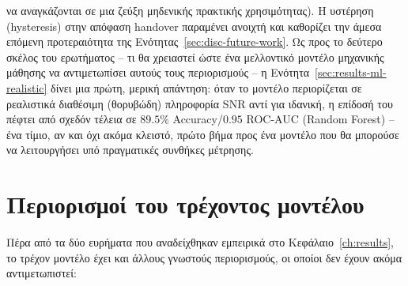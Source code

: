 \begin{itemize}
    να αναγκάζονται σε μια ζεύξη μηδενικής πρακτικής χρησιμότητας). Η
    υστέρηση (hysteresis) στην απόφαση handover παραμένει ανοιχτή και
    καθορίζει την άμεσα επόμενη προτεραιότητα της
    Ενότητας~\ref{sec:disc-future-work}. Ως προς το δεύτερο σκέλος του
    ερωτήματος -- τι θα χρειαστεί ώστε ένα
    μελλοντικό μοντέλο μηχανικής μάθησης να αντιμετωπίσει αυτούς τους
    περιορισμούς -- η Ενότητα~\ref{sec:results-ml-realistic} δίνει μια
    πρώτη, μερική απάντηση: όταν το μοντέλο περιορίζεται σε ρεαλιστικά
    διαθέσιμη (θορυβώδη) πληροφορία SNR αντί για ιδανική, η επίδοσή του
    πέφτει από σχεδόν τέλεια σε $89.5\%$ Accuracy/$0.95$ ROC-AUC
    (Random Forest) -- ένα τίμιο, αν και όχι ακόμα κλειστό, πρώτο βήμα
    προς ένα μοντέλο που θα μπορούσε να λειτουργήσει υπό πραγματικές
    συνθήκες μέτρησης.
\end{itemize}

\section{Περιορισμοί του τρέχοντος μοντέλου}
\label{sec:disc-limitations}

Πέρα από τα δύο ευρήματα που αναδείχθηκαν εμπειρικά στο
Κεφάλαιο~\ref{ch:results}, το τρέχον μοντέλο έχει και άλλους γνωστούς
περιορισμούς, οι οποίοι δεν έχουν ακόμα αντιμετωπιστεί:

